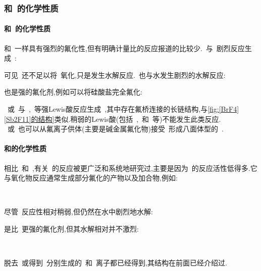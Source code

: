 \documentclass{ctexbook}
\begin{document}
\subsubsection{和~的化学性质}
\paragraph{和~的化学性质}
和~一样具有强烈的氟化性,但有明确计量比的反应报道的比较少.~与~剧烈反应生成~:
\begin{tightcenter}
\end{tightcenter}
可见~还不足以将~氧化,只是发生水解反应.~也与水发生剧烈的水解反应:
\begin{tightcenter}
\end{tightcenter}
也是强的氟化剂,例如可以将硅酸盐完全氟化:
\begin{tightcenter}
\end{tightcenter}
\indent ~或~与~,~等强Lewis酸反应生成~\ce{[XF4]+[MF6]-},其中存在氟桥连接的长链结构,与\autoref{fig:[BrF4][Sb2F11]的结构}类似.稍弱的Lewis酸(包括~,~和~等)不能发生此类反应.\\
\indent ~或~也可以从氟离子供体(主要是碱金属氟化物)接受~形成八面体型的~\ce{[XF6]-}.
\paragraph{和的化学性质}
相比~和~,有关~的反应被更广泛和系统地研究过,主要是因为~的反应活性低得多.它与氧化物反应通常生成部分氟化的产物以及加合物,例如:
\begin{tightcenter}
    \\
\end{tightcenter}
尽管~反应性相对稍弱,但仍然在水中剧烈地水解:
\begin{tightcenter}
\end{tightcenter}
\indent {}是比~更强的氟化剂,但其水解相对并不激烈:
\begin{tightcenter}
    \\
\end{tightcenter}
脱去~或得到~分别生成的~\ce{[IF6]+}和~\ce{[IF8]-}离子都已经得到,其结构在前面已经介绍过.
\end{document}
